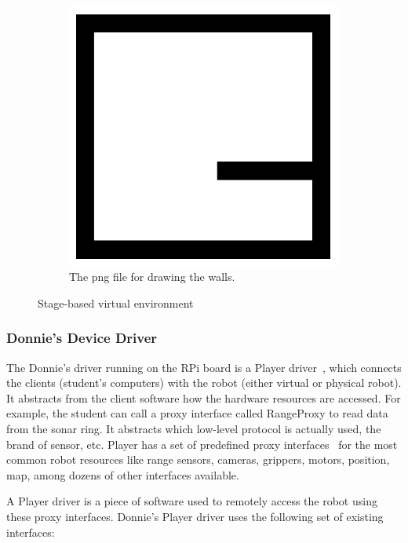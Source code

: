 \begin{figure}[h!]
        \begin{subfigure}[b]{0.7\linewidth}
        \centering
        \includegraphics[width=0.8\linewidth]{figs/mapa-stage.png}
        \caption{The png file for drawing the walls.}
        \label{fig:stage-wall}
    \end{subfigure}

    \caption{Stage-based virtual environment}
    \label{fig:stage}
\end{figure}



\subsubsection{Donnie's Device Driver}
\label{sec:driver}

The Donnie's driver running on the RPi board is a Player driver~\cite{vaughan2007}, which connects the clients (student's computers) with the robot (either virtual or physical robot). It abstracts from the client software how the hardware resources are accessed. For example, the student can call a proxy interface called RangeProxy to read data from the sonar ring. It abstracts which low-level protocol is actually used, the brand of sensor, etc. Player has a set of predefined proxy interfaces~\cite{vaughan2007} for the most common robot resources like range sensors, cameras, grippers, motors, position, map, among dozens of other interfaces available. 

A Player driver is a piece of software used to remotely access the robot using these proxy interfaces. Donnie's Player driver uses the following set of existing interfaces:

